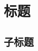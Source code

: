 \documentclass[12pt]{article} %
\begin{document}
\newpage %


\section{标题} %
\subsection{子标题} %








\begin{thebibliography}{99} %




\end{thebibliography}
\end{document}
